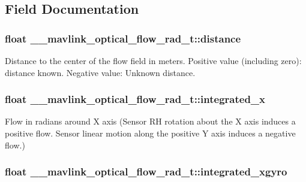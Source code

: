 \subsection{Field Documentation}
\hypertarget{struct____mavlink__optical__flow__rad__t_ada976b8a6db1ec3228d745c9ad81d4f3}{
\subsubsection[{distance}]{\setlength{\rightskip}{0pt plus 5cm}float \+\_\+\+\_\+mavlink\+\_\+optical\+\_\+flow\+\_\+rad\+\_\+t\+::distance}}\label{struct____mavlink__optical__flow__rad__t_ada976b8a6db1ec3228d745c9ad81d4f3}


Distance to the center of the flow field in meters. Positive value (including zero)\+: distance known. Negative value\+: Unknown distance. 

\hypertarget{struct____mavlink__optical__flow__rad__t_a1253563da9b3db2235f33a6aae3d9427}{
\subsubsection[{integrated\+\_\+x}]{\setlength{\rightskip}{0pt plus 5cm}float \+\_\+\+\_\+mavlink\+\_\+optical\+\_\+flow\+\_\+rad\+\_\+t\+::integrated\+\_\+x}}\label{struct____mavlink__optical__flow__rad__t_a1253563da9b3db2235f33a6aae3d9427}


Flow in radians around X axis (Sensor R\+H rotation about the X axis induces a positive flow. Sensor linear motion along the positive Y axis induces a negative flow.) 

\hypertarget{struct____mavlink__optical__flow__rad__t_a8c0376467ce566ac5d2c2514b3bc9c75}{
\subsubsection[{integrated\+\_\+xgyro}]{\setlength{\rightskip}{0pt plus 5cm}float \+\_\+\+\_\+mavlink\+\_\+optical\+\_\+flow\+\_\+rad\+\_\+t\+::integrated\+\_\+xgyro}}\label{struct____mavlink__optical__flow__rad__t_a8c0376467ce566ac5d2c2514b3bc9c75}


